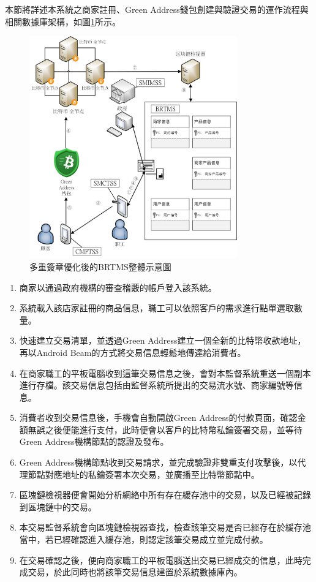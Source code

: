 本節將詳述本系統之商家註冊、Green Address錢包創建與驗證交易的運作流程與相關數據庫架構，如圖\ref{gabpcss}所示。

	\begin{figure}[htbp]
		\centering
		\includegraphics[width = 0.8\textwidth]{gabpcss.jpg}
		\caption{多重簽章優化後的BRTMS整體示意圖}\label{gabpcss}
	\end{figure}

	\begin{enumerate}
		\item 商家以通過政府機構的審查稽覈的帳戶登入該系統。
		\item 系統載入該店家註冊的商品信息，職工可以依照客戶的需求進行點單選取數量。
		\item 快速建立交易清單，並透過Green Address建立一個全新的比特幣收款地址，再以Android Beam的方式將交易信息輕鬆地傳達給消費者。
		\item 在商家職工的平板電腦收到這筆交易信息之後，會對本監督系統重送一個副本進行存檔。該交易信息包括由監督系統所提出的交易流水號、商家編號等信息。
		\item 消費者收到交易信息後，手機會自動開啟Green Address的付款頁面，確認金額無誤之後便能進行支付，此時便會以客戶的比特幣私鑰簽署交易，並等待Green Address機構節點的認證及發布。
		\item Green Address機構節點收到交易請求，並完成驗證非雙重支付攻擊後，以代理節點對應地址的私鑰簽署本次交易，並廣播至比特幣節點中。
		\item 區塊鏈檢視器便會開始分析網絡中所有存在緩存池中的交易，以及已經被記錄到區塊鏈中的交易。
		\item 本交易監督系統會向區塊鏈檢視器查找，檢查該筆交易是否已經存在於緩存池當中，若已經確認進入緩存池，則認定該筆交易成立並完成付款。
		\item 在交易確認之後，便向商家職工的平板電腦送出交易已經成交的信息，此時完成交易，於此同時也將該筆交易信息建置於系統數據庫內。
	\end{enumerate}